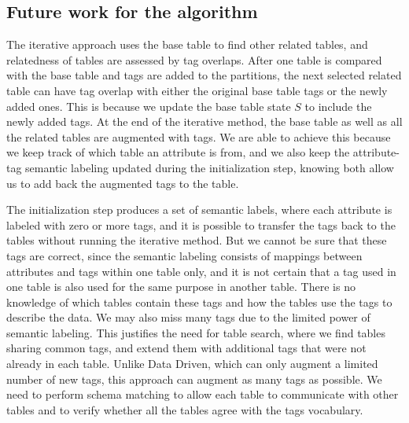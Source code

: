 \subsection{Future work for the algorithm}
\label{ssec:FutureWorkForTheAlgorithm}

The iterative approach uses the base table to find other related tables, and relatedness of tables are assessed by tag overlaps. After one table is compared with the base table and tags are added to the partitions, the next selected related table can have tag overlap with either the original base table tags or the newly added ones. This is because we update the base table state $S$ to include the newly added tags. At the end of the iterative method, the base table as well as all the related tables are augmented with tags. We are able to achieve this because we keep track of which table an attribute is from, and we also keep the attribute-tag semantic labeling updated during the initialization step, knowing both allow us to add back the augmented tags to the table.

The initialization step produces a set of semantic labels, where each attribute is labeled with zero or more tags, and it is possible to transfer the tags back to the tables without running the iterative method. But we cannot be sure that these tags are correct, since the semantic labeling consists of mappings between attributes and tags within one table only, and it is not certain that a tag used in one table is also used for the same purpose in another table. There is no knowledge of which tables contain these tags and how the tables use the tags to describe the data. We may also miss many tags due to the limited power of semantic labeling. This justifies the need for table search, where we find tables sharing common tags, and extend them with additional tags that were not already in each table. Unlike Data Driven, which can only augment a limited number of new tags, this approach can augment as many tags as possible. We need to perform schema matching to allow each table to communicate with other tables and to verify whether all the tables agree with the tags vocabulary.

